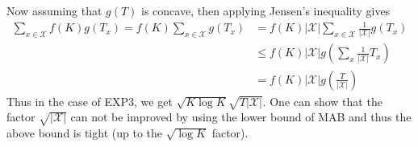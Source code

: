 \documentclass[11pt]{article}
\begin{document}
Now assuming that $g(T)$ is concave, then applying Jensen's inequality gives
\begin{align*}
\sum_{x \in \mathcal{X}}  f(K) g(T_x)  = f(K) \sum_{x \in \mathcal{X}} g(T_x) & = f(K) |\mathcal{X}| \sum_{x \in \mathcal{X}} \frac{1}{|\mathcal{X}|} g(T_x) \\
& \leq f(K) |\mathcal{X}| g\left(\sum_x  \frac{1}{|\mathcal{X}|} T_x \right)\\
& =  f(K) |\mathcal{X}| g\left(\frac{T}{|\mathcal{X}|}\right)
\end{align*}
Thus in the case of EXP3, we get $\sqrt{K \log K} \sqrt{T |\mathcal{X}|}$. One can show that the factor $\sqrt{|\mathcal{X}|}$ can not be improved by using the lower bound of MAB and thus the above bound is tight (up to the $\sqrt{\log K}$ factor).
\newpage

\end{document}
